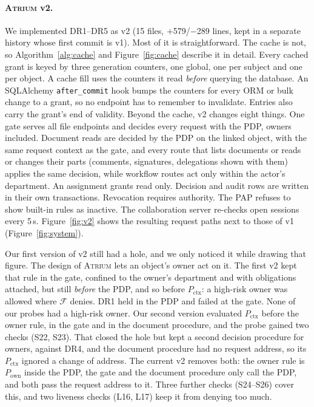 \documentclass[sigconf,review,anonymous]{acmart}
\newcommand{\sysname}{\textsc{Atrium}\xspace}
\newcommand{\sysname}{\textsc{OpenZTAC}\xspace}
\newcommand{\Px}{P_{\mathrm{ctx}}}
\newcommand{\Po}{P_{\mathrm{own}}}
\begin{document}
\paragraph{\sysname v2.} We implemented DR1--DR5 as v2 (15 files, $+$579/$-$289 lines, kept in a separate
history whose first commit is v1). Most of it is straightforward. The cache is not, so Algorithm~\ref{alg:cache} and
Figure~\ref{fig:cache} describe it in detail. Every cached grant is keyed by three generation counters, one global, one per
subject and one per object. A cache fill uses the counters it read \emph{before} querying the database. An
SQLAlchemy \texttt{after\_commit} hook bumps the counters for every ORM or bulk change to a grant, so no endpoint
has to remember to invalidate. Entries also carry the grant's end of validity. Beyond the cache, v2 changes
eight things. One gate serves all file endpoints and decides every request with the PDP, owners included.
Document reads are decided by the PDP on the linked object, with the same request context as the gate, and
every route that lists documents or reads or changes their parts (comments, signatures, delegations shown with
them) applies the same decision, while workflow routes act only within the actor's department. An assignment
grants read only.
Decision and audit rows are written in their own transactions. Revocation requires authority. The PAP refuses to
show built-in rules as inactive. The collaboration server re-checks open sessions every 5\,s. Figure~\ref{fig:v2} shows the
resulting request paths next to those of v1 (Figure~\ref{fig:system}).

Our first version of v2 still had a hole, and we only noticed it while drawing that figure. The design of
\sysname lets an object's owner act on it. The first v2 kept that rule in the gate, confined to the owner's
department and with obligations attached, but still \emph{before} the PDP, and so before $\Px$: a high-risk owner
was allowed where $\mathcal{F}$ denies. DR1 held in the PDP and failed at the gate. None of our probes had a
high-risk owner. Our second version evaluated $\Px$ before the owner rule, in the gate and in the document
procedure, and the probe gained two checks (S22, S23). That closed the hole but kept a second decision procedure
for owners, against DR4, and the document procedure had no request address, so its $\Px$ ignored a change of
address. The current v2 removes both: the owner rule is $\Po$ inside the PDP, the gate and the document procedure
only call the PDP, and both pass the request address to it. Three further checks (S24--S26) cover this, and two
liveness checks (L16, L17) keep it from denying too much.
\end{document}
